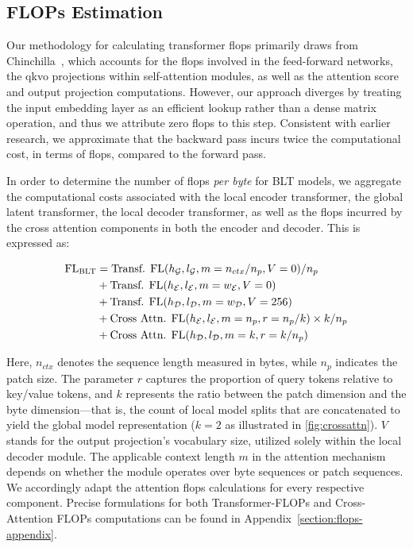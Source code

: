 \subsection{FLOPs Estimation} 
\label{section:flops}

Our methodology for calculating transformer flops primarily draws from Chinchilla~\citep{hoffmann2022training}, which accounts for the flops involved in the feed-forward networks, the qkvo projections within self-attention modules, as well as the attention score and output projection computations. However, our approach diverges by treating the input embedding layer as an efficient lookup rather than a dense matrix operation, and thus we attribute zero flops to this step. Consistent with earlier research, we approximate that the backward pass incurs twice the computational cost, in terms of flops, compared to the forward pass.

In order to determine the number of flops \textit{per byte} for {\textsc BLT} models, we aggregate the computational costs associated with the local encoder transformer, the global latent transformer, the local decoder transformer, as well as the flops incurred by the cross attention components in both the encoder and decoder. This is expressed as:

\begin{align}
    \text{FL}_{\text{{\textsc BLT}}} &= \text{Transf. FL}(h_{\mathcal{G}}, l_{\mathcal{G}}, m=n_{ctx}/n_p, V=0) / n_p\\
    &+ \text{Transf. FL}(h_{\mathcal{E}}, l_{\mathcal{E}}, m=w_{\mathcal{E}}, V=0) \\
    &+ \text{Transf. FL}(h_{\mathcal{D}}, l_{\mathcal{D}}, m=w_{\mathcal{D}}, V=256) \\ 
    &+ \text{Cross Attn. FL}(h_{\mathcal{E}}, l_{\mathcal{E}}, m=n_p, r=n_p/k) \times k/n_p \\ 
    &+ \text{Cross Attn. FL}(h_{\mathcal{D}}, l_{\mathcal{D}}, m=k, r=k/n_p) 
\end{align}

Here, $n_{ctx}$ denotes the sequence length measured in bytes, while $n_p$ indicates the patch size. The parameter $r$ captures the proportion of query tokens relative to key/value tokens, and $k$ represents the ratio between the patch dimension and the byte dimension—that is, the count of local model splits that are concatenated to yield the global model representation ($k=2$ as illustrated in \autoref{fig:crossattn}). $V$ stands for the output projection's vocabulary size, utilized solely within the local decoder module. The applicable context length $m$ in the attention mechanism depends on whether the module operates over byte sequences or patch sequences. We accordingly adapt the attention flops calculations for every respective component. Precise formulations for both Transformer-FLOPs and Cross-Attention FLOPs computations can be found in Appendix~\ref{section:flops-appendix}.

